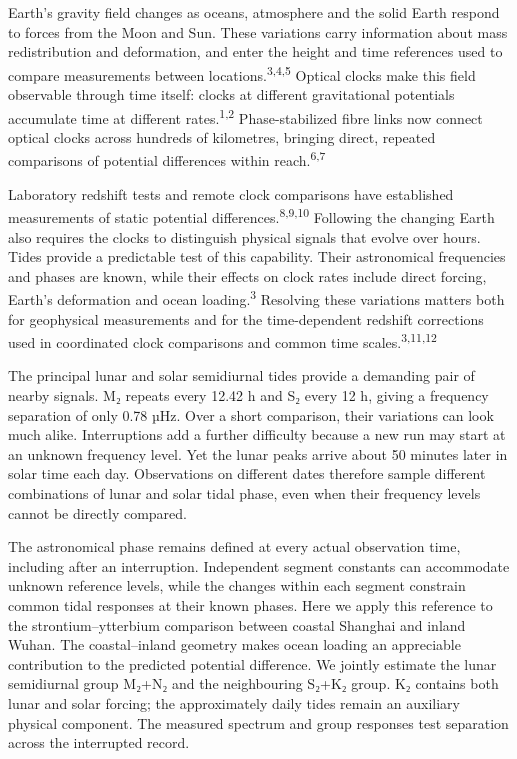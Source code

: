 \documentclass[
  12pt,
  a4paper,
]{article}
\begin{document}
\clearpage

Earth's gravity field changes as oceans, atmosphere and the solid Earth
respond to forces from the Moon and Sun. These variations carry
information about mass redistribution and deformation, and enter the
height and time references used to compare measurements between
locations.\textsuperscript{3,4,5} Optical clocks make this field
observable through time itself: clocks at different gravitational
potentials accumulate time at different rates.\textsuperscript{1,2}
Phase-stabilized fibre links now connect optical clocks across hundreds
of kilometres, bringing direct, repeated comparisons of potential
differences within reach.\textsuperscript{6,7}

Laboratory redshift tests and remote clock comparisons have established
measurements of static potential differences.\textsuperscript{8,9,10}
Following the changing Earth also requires the clocks to distinguish
physical signals that evolve over hours. Tides provide a predictable
test of this capability. Their astronomical frequencies and phases are
known, while their effects on clock rates include direct forcing,
Earth's deformation and ocean loading.\textsuperscript{3} Resolving
these variations matters both for geophysical measurements and for the
time-dependent redshift corrections used in coordinated clock
comparisons and common time scales.\textsuperscript{3,11,12}

The principal lunar and solar semidiurnal tides provide a demanding pair
of nearby signals. M₂ repeats every 12.42 h and S₂ every 12 h, giving a
frequency separation of only 0.78 µHz. Over a short comparison, their
variations can look much alike. Interruptions add a further difficulty
because a new run may start at an unknown frequency level. Yet the lunar
peaks arrive about 50 minutes later in solar time each day. Observations
on different dates therefore sample different combinations of lunar and
solar tidal phase, even when their frequency levels cannot be directly
compared.

The astronomical phase remains defined at every actual observation time,
including after an interruption. Independent segment constants can
accommodate unknown reference levels, while the changes within each
segment constrain common tidal responses at their known phases. Here we
apply this reference to the strontium--ytterbium comparison between
coastal Shanghai and inland Wuhan. The coastal--inland geometry makes
ocean loading an appreciable contribution to the predicted potential
difference. We jointly estimate the lunar semidiurnal group M₂+N₂ and
the neighbouring S₂+K₂ group. K₂ contains both lunar and solar forcing;
the approximately daily tides remain an auxiliary physical component.
The measured spectrum and group responses test separation across the
interrupted record.
\end{document}
